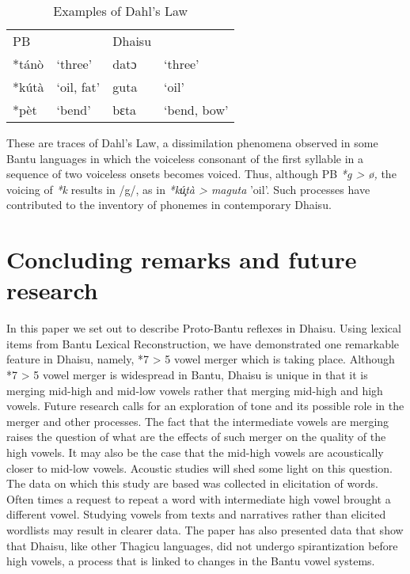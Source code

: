 \documentclass[output=paper,colorlinks,citecolor=brown]{langscibook}
\begin{document}
\begin{table}
    \caption{Examples of Dahl's Law}
    \label{tab:ngonyani:19}
    \begin{tabular}{@{}l l l l@{}}
        PB & & Dhaisu &  \\
        *tánò & `three' & datɔ & `three'\\
        *kútà & `oil, fat' & guta & `oil'\\
        *pèt & `bend'&  bɛta & `bend, bow'\\
    \end{tabular}
\end{table}

These are traces of Dahl’s Law, a dissimilation phenomena observed in some Bantu languages in which the voiceless consonant of the first syllable in a sequence of two voiceless onsets becomes voiced. Thus, although PB \textit{*g > ø,} the voicing of \textit{*k} results in /g/, as in \textit{*kú̧tà > maguta} 'oil'. Such processes have contributed to the inventory of phonemes in contemporary Dhaisu.

\section{Concluding remarks and future research}\label{sec:ngonyani:6}

In this paper we set out to describe Proto-Bantu reflexes in Dhaisu. Using lexical items from Bantu Lexical Reconstruction, we have demonstrated one remarkable feature in Dhaisu, namely, *7 > 5 vowel merger which is taking place. Although *7 > 5 vowel merger is widespread in Bantu, Dhaisu is unique in that it is merging mid-high and mid-low vowels rather that merging mid-high and high vowels. Future research calls for an exploration of tone and its possible role in the merger and other processes. The fact that the intermediate vowels are merging raises the question of what are the effects of such merger on the quality of the high vowels. It may also be the case that the mid-high vowels are acoustically closer to mid-low vowels. Acoustic studies will shed some light on this question. The data on which this study are based was collected in elicitation of words. Often times a request to repeat a word with intermediate high vowel brought a different vowel. Studying vowels from texts and narratives rather than elicited wordlists may result in clearer data. The paper has also presented data that show that Dhaisu, like other Thagicu languages, did not undergo spirantization before high vowels, a process that is linked to changes in the Bantu vowel systems. 
\end{document}
